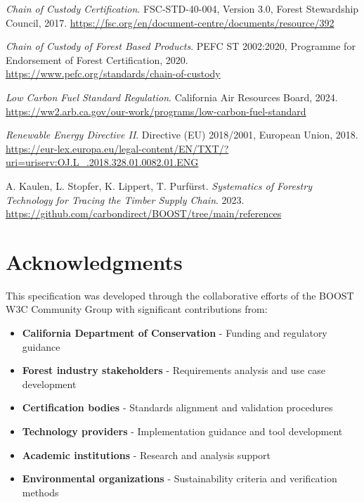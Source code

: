 \documentclass{article}
\begin{document}
\begin{thebibliography}{99}
\textit{Chain of Custody Certification}. FSC-STD-40-004, Version 3.0, Forest Stewardship Council, 2017.
\url{https://fsc.org/en/document-centre/documents/resource/392}

\textit{Chain of Custody of Forest Based Products}. PEFC ST 2002:2020, Programme for Endorsement of Forest Certification, 2020.
\url{https://www.pefc.org/standards/chain-of-custody}

\textit{Low Carbon Fuel Standard Regulation}. California Air Resources Board, 2024.
\url{https://ww2.arb.ca.gov/our-work/programs/low-carbon-fuel-standard}

\textit{Renewable Energy Directive II}. Directive (EU) 2018/2001, European Union, 2018.
\url{https://eur-lex.europa.eu/legal-content/EN/TXT/?uri=uriserv:OJ.L_.2018.328.01.0082.01.ENG}

A. Kaulen, L. Stopfer, K. Lippert, T. Purfürst. \textit{Systematics of Forestry Technology for Tracing the Timber Supply Chain}. 2023.
\url{https://github.com/carbondirect/BOOST/tree/main/references}

\end{thebibliography}

\section*{Acknowledgments}

This specification was developed through the collaborative efforts of the BOOST W3C Community Group with significant contributions from:

\begin{itemize}
    \item \textbf{California Department of Conservation} - Funding and regulatory guidance
    \item \textbf{Forest industry stakeholders} - Requirements analysis and use case development  
    \item \textbf{Certification bodies} - Standards alignment and validation procedures
    \item \textbf{Technology providers} - Implementation guidance and tool development
    \item \textbf{Academic institutions} - Research and analysis support
    \item \textbf{Environmental organizations} - Sustainability criteria and verification methods
\end{itemize}
\end{document}
